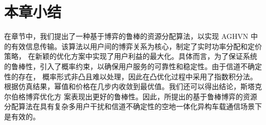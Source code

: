 \section{本章小结}\label{section2-5}
在章节中，我们提出了一种基于博弈的鲁棒的资源分配算法，以实现 AGHVN 中的有效信息传输。该算法以用户间的博弈关系为核心，制定了实时功率分配和定价策略，
在新颖的优化方案中实现了用户利益的最大化。具体而言，为了保证系统的鲁棒性，引入了概率约束，以确保用户服务的可靠性和稳定性。由于信道不确定性的存在，
概率形式非凸且难以处理，因此在凸优化过程中采用了指数积分法。根据仿真结果，幂值和价格在几步内收敛到最优值。我们还可以得出结论，斯塔克尔伯格博弈优化方
案表现出更好的鲁棒性。因此，所提出的基于鲁棒博弈的资源分配算法在具有复杂多用户干扰和信道不确定性的空地一体化异构车载通信场景下是有效的。






















